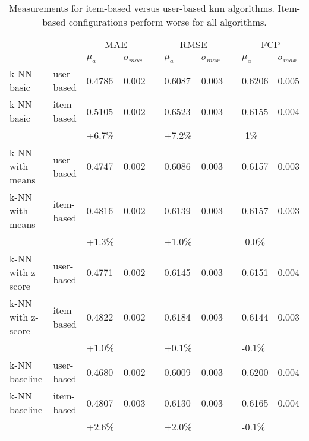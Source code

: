 \begin{sidewaystable}
    \centering
    \caption[User-based versus item-based \gls{knn} algorithms]{Measurements for item-based versus user-based \gls{knn} algorithms. Item-based configurations perform worse for all algorithms.}
    \small
    \begin{tabular}{ll ll l ll l ll }
                 && \multicolumn{2}{c}{MAE} &&
                 \multicolumn{2}{c}{RMSE} &&
                 \multicolumn{2}{c}{FCP} \\
    \cline{3-4} \cline{6-7} \cline{9-10}
    && $\mu_a$ & $\sigma_{max}$ && $\mu_a$ & $\sigma_{max}$ && $\mu_a$ & $\sigma_{max}$ \\
    \hline
    k-NN basic        & user-based & 0.4786 & 0.002 && 0.6087 & 0.003 && 0.6206 & 0.005 \\ %
    k-NN basic        & item-based & 0.5105 & 0.002 && 0.6523 & 0.003 && 0.6155 & 0.004\\ %
                      &            & \textcolor{scw-orange}{+6.7\%} &&& \textcolor{scw-orange}{+7.2\%}
                      &&& \textcolor{scw-orange}{-1\%} \\
    k-NN with means   & user-based & 0.4747 & 0.002 && 0.6086 & 0.003 && 0.6157 & 0.003 \\ %
    k-NN with means   & item-based & 0.4816 & 0.002 && 0.6139 & 0.003 && 0.6157 & 0.003 \\ %
                      &            & \textcolor{scw-orange}{+1.3\%} &&& \textcolor{scw-orange}{+1.0\%}
                      &&& \textcolor{scw-orange}{-0.0\%} \\
    k-NN with z-score & user-based & 0.4771 & 0.002 && 0.6145 & 0.003 && 0.6151 & 0.004 \\ %
    k-NN with z-score & item-based & 0.4822 & 0.002 && 0.6184 & 0.003 && 0.6144 & 0.003 \\ %
                      &            & \textcolor{scw-orange}{+1.0\%} &&& \textcolor{scw-orange}{+0.1\%}
                      &&& \textcolor{scw-orange}{-0.1\%} \\
    k-NN baseline     & user-based & 0.4680 & 0.002 && 0.6009 & 0.003 && 0.6200 & 0.004 \\ %
    k-NN baseline     & item-based & 0.4807 & 0.003 && 0.6130 & 0.003 && 0.6165 & 0.004 \\ %
                      &            & \textcolor{scw-orange}{+2.6\%} &&& \textcolor{scw-orange}{+2.0\%}
                      &&& \textcolor{scw-orange}{-0.1\%} \\
    \end{tabular}
\end{sidewaystable}

